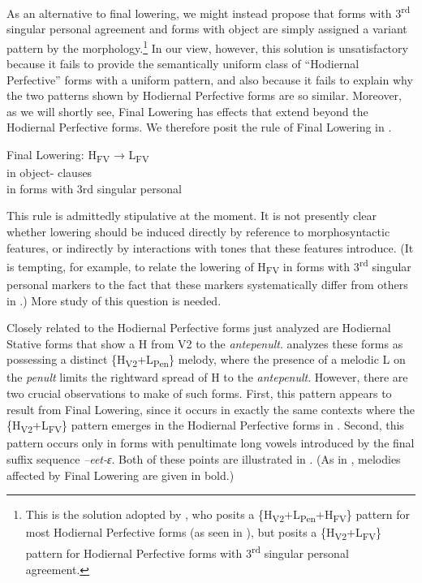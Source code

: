 \documentclass[output=paper,newtxmath,modfonts,nonflat,draft]{langsci/langscibook}
\begin{document}
As an alternative to final lowering, we might instead propose that forms with 3\textsuperscript{rd} singular personal agreement and forms with object  are simply assigned a variant  pattern by the morphology.\footnote{This
  is the solution adopted by \citet{Roberts-Kohno2014}, who posits a \{H\textsubscript{V2}+L\textsubscript{Pen}+H\textsubscript{FV}\} pattern for most Hodiernal Perfective forms (as seen in ), but posits a \{H\textsubscript{V2}+L\textsubscript{FV}\} pattern for Hodiernal Perfective forms with 3\textsuperscript{rd} singular personal agreement.}
In our view, however, this solution is unsatisfactory because it fails to provide the semantically uniform class of “Hodiernal Perfective” forms with a uniform  pattern, and also because it fails to explain why the two  patterns shown by Hodiernal Perfective forms are so similar. Moreover, as we will shortly see, Final Lowering has effects that extend beyond the Hodiernal Perfective forms. We therefore posit the rule of Final Lowering in .

\ea\label{ex:jones:7}
Final Lowering: H\textsubscript{FV} → L\textsubscript{FV} \\
\ea\label{ex:jones:7a}
in object- clauses\\
\ex\label{ex:jones:7b}
in forms with 3rd singular personal  \\
\z
\z


This rule is admittedly stipulative at the moment. It is not presently clear whether lowering should be induced directly by reference to morphosyntactic features, or indirectly by interactions with tones that these features introduce. (It is tempting, for example, to relate the lowering of H\textsubscript{FV} in forms with 3\textsuperscript{rd} singular personal  markers to the fact that these markers systematically differ from others in .) More study of this question is needed.

Closely related to the Hodiernal Perfective forms just analyzed are Hodiernal Stative forms that show a H  from V2 to the \textit{antepenult}. \citet{Roberts-Kohno2014} analyzes these forms as possessing a distinct \{H\textsubscript{V2}+L\textsubscript{Pen}\} melody, where the presence of a melodic L on the \textit{penult} limits the rightward spread of H to the \textit{antepenult}. However, there are two crucial observations to make of such forms. First, this  pattern appears to result from Final Lowering, since it occurs in exactly the same contexts where the \{H\textsubscript{V2}+L\textsubscript{FV}\} pattern emerges in the Hodiernal Perfective forms in . Second, this pattern occurs only in forms with penultimate long vowels introduced by the final suffix sequence \textit{–eet-ɛ}. Both of these points are illustrated in . (As in , melodies affected by Final Lowering are given in bold.)
\end{document}
